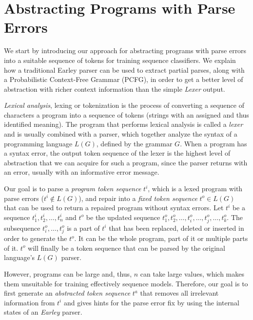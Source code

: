 \section{Abstracting Programs with Parse Errors}
\label{sec:prog-abstract}

We start by introducing our approach for abstracting programs with parse errors
into a suitable sequence of tokens for training sequence classifiers. We explain
how a traditional Earley parser can be used to extract partial parses, along
with a Probabilistic Context-Free Grammar (PCFG), in order to get a better level
of abstraction with richer context information than the simple \emph{Lexer}
output.



\emph{Lexical analysis}, lexing or tokenization is the process of converting a
sequence of characters \ie a program into a sequence of tokens (strings with an
assigned and thus identified meaning). The program that performs lexical
analysis is called a \emph{lexer} and is usually combined with a parser, which
together analyze the syntax of a programming language $L(G)$, defined by the
grammar $G$. When a program has a syntax error, the output token sequence of the
lexer is the highest level of abstraction that we can acquire for such a
program, since the parser returns with an error, usually with an informative
error message.

Our goal is to parse a \emph{program token sequence} $t^i$, which is a lexed
program with parse errors (\ie $t^i \notin L(G)$), and repair into a \emph{fixed
token sequence} $t^o \in L(G)$ that can be used to return a repaired program
without syntax errors. Let $t^i$ be a sequence $t^i_1, t^i_2, \dots, t^i_n$ and
$t^o$ be the updated sequence $t^o_1, t^o_2, \dots, t^o_i, \dots, t^o_j, \dots,
t^o_k$. The subsequence $t^o_i, \dots, t^o_j$ is a part of $t^i$ that has been
replaced, deleted or inserted in order to generate the $t^o$. It can be the
whole program, part of it or multiple parts of it. $t^o$ will finally be a token
sequence that can be parsed by the original language's $L(G)$ parser.

However, programs can be large and, thus, $n$ can take large values, which makes
them unsuitable for training effectively sequence models. Therefore, our goal is
to first generate an \emph{abstracted token sequence} $t^a$ that removes all
irrelevant information from $t^i$ and gives hints for the parse error fix by
using the internal states of an \emph{Earley} parser.


